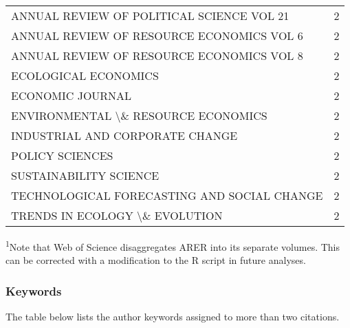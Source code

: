 \documentclass[]{article}
\begin{document}
\begin{longtable}{lc}
ANNUAL REVIEW OF POLITICAL SCIENCE VOL 21 & 2 \\ 
ANNUAL REVIEW OF RESOURCE ECONOMICS VOL 6 & 2 \\ 
ANNUAL REVIEW OF RESOURCE ECONOMICS VOL 8 & 2 \\ 
ECOLOGICAL ECONOMICS & 2 \\ 
ECONOMIC JOURNAL & 2 \\ 
ENVIRONMENTAL \textbackslash \& RESOURCE ECONOMICS & 2 \\ 
INDUSTRIAL AND CORPORATE CHANGE & 2 \\ 
POLICY SCIENCES & 2 \\ 
SUSTAINABILITY SCIENCE & 2 \\ 
TECHNOLOGICAL FORECASTING AND SOCIAL CHANGE & 2 \\ 
TRENDS IN ECOLOGY \textbackslash \& EVOLUTION & 2 \\ 
\bottomrule
\end{longtable}
\vspace{-5mm}
\begin{minipage}{\linewidth}
\textsuperscript{1}Note that Web of Science disaggregates ARER into its separate volumes. This can be corrected with a modification to the R script in future analyses. \\ 
\end{minipage}

\hypertarget{keywords}{%
\subsubsection{Keywords}\label{keywords}}

The table below lists the author keywords assigned to more than two
citations. \captionsetup[table]{labelformat=empty,skip=1pt}
\end{document}
